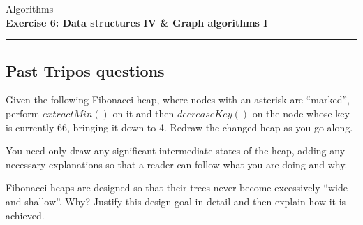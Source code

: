 \documentclass[10pt,a4paper]{exam}
\begin{document}
\begin{center}
\Large Algorithms \\
\LARGE \textbf{Exercise 6: Data structures IV \& Graph algorithms I} \\
\end{center}

\hrule

\vspace{0.5cm}


\marksnotpoints
\pointsdroppedatright
\marksnotpoints
\marginpointname{ \points}

\begin{questions}

\section{Past Tripos questions}

\question[5] Given the following Fibonacci heap, where nodes with an asterisk are ``marked'', perform $\mathit{extractMin}()$ on it and then $\mathit{decreaseKey()}$ on the node whose key is currently 66, bringing it down to 4. Redraw the changed heap as you go along.

You need only draw any significant intermediate states of the heap, adding any necessary explanations so that a reader can follow what you are doing and why. \droppoints 
\begin{center}
\end{center}

\question[5] Fibonacci heaps are designed so that their trees never become excessively ``wide and shallow''. Why? Justify this design goal in detail and then explain how it is achieved. \droppoints 


\end{questions}
\end{document}
